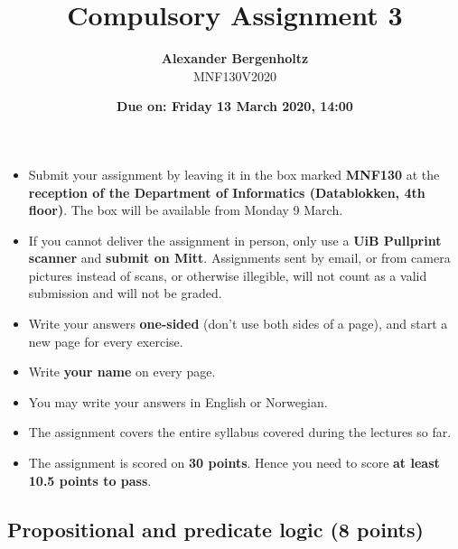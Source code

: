 \documentclass[12pt]{article}
\title{\huge Compulsory Assignment 3}
\author{\LARGE \textbf{Alexander Bergenholtz}\\ \LARGE MNF130V2020\\}
\date{\Large\textbf{Due on: Friday 13 March 2020, 14:00}}
\begin{document}
\maketitle

\bigskip

  \vspace*{15mm}

  {\large
  \begin{minipage}{\linewidth}
    \begin{itemize}
    \item Submit your assignment by leaving it in the box marked
      \textbf{MNF130} at the \textbf{reception of the Department of
        Informatics (Datablokken, 4th floor)}. The box will be
      available from Monday 9 March.  \smallskip
    \item If you cannot deliver the assignment in person, only use a
      \textbf{UiB Pullprint scanner} and \textbf{submit on
        Mitt}. Assignments sent by email, or from camera pictures
      instead of scans, or otherwise illegible, will not count as a
      valid submission and will not be graded.
      \smallskip
    \item Write your answers \textbf{one-sided} (don't use both sides
      of a page), and start a new page for every exercise.
      \smallskip
    \item Write \textbf{your name} on every page.
      \smallskip
    \item You may write your answers in English or Norwegian.
      \smallskip
    \item The assignment covers the entire syllabus covered during the
      lectures so far.
      \smallskip
    \item The assignment is scored on \textbf{30 points}. Hence you
      need to score \textbf{at least 10.5 points to pass}.
  \end{itemize}
  \end{minipage}
  }

\bigskip

\bigskip

\newpage

\subsection{Propositional and predicate logic (8 points)}
\end{document}

